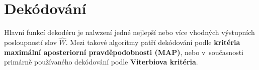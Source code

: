 \section{Dekódování}
\label{chap:asr:decoding}

Hlavní funkcí dekodéru je nalwzení jedné nejlepší nebo více vhodných výstupních posloupností slov $\hat{W}$.
Mezi takové algoritmy patří dekódování podle \textbf{kritéria maximální aposteriorní pravděpodobnosti (MAP)}, nebo v~současnosti primárně používaného dekódování podle \textbf{Viterbiova kritéria}.




